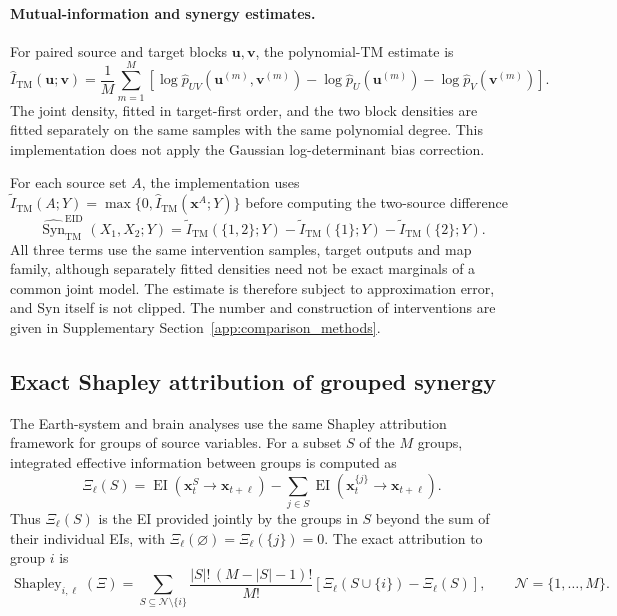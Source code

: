 {\paragraph{Mutual-information and synergy estimates.}
For paired source and target blocks \(\boldsymbol{u},\boldsymbol{v}\), the polynomial-TM estimate is
\begin{equation}
\widehat I_{\mathrm{TM}}(\boldsymbol{u};\boldsymbol{v})
=\frac1M\sum_{m=1}^{M}
\left[
\log\widehat p_{UV}(\boldsymbol{u}^{(m)},\boldsymbol{v}^{(m)})
-\log\widehat p_U(\boldsymbol{u}^{(m)})
-\log\widehat p_V(\boldsymbol{v}^{(m)})
\right].
\label{eq:transport-map-mi-estimator}
\end{equation}
The joint density, fitted in target-first order, and the two block densities are fitted separately on the same samples with the same polynomial degree. This implementation does not apply the Gaussian log-determinant bias correction.

For each source set \(A\), the implementation uses \(\widetilde I_{\mathrm{TM}}(A;Y)=\max\{0,\widehat I_{\mathrm{TM}}(\boldsymbol{x}^{A};Y)\}\) before computing the two-source difference
\begin{equation}
\widehat{\operatorname{Syn}}^{\mathrm{EID}}_{\mathrm{TM}}(X_1,X_2;Y)
=\widetilde I_{\mathrm{TM}}(\{1,2\};Y)
-\widetilde I_{\mathrm{TM}}(\{1\};Y)
-\widetilde I_{\mathrm{TM}}(\{2\};Y).
\label{eq:transport-map-two-source-synergy}
\end{equation}
All three terms use the same intervention samples, target outputs and map family, although separately fitted densities need not be exact marginals of a common joint model. The estimate is therefore subject to approximation error, and Syn itself is not clipped. The number and construction of interventions are given in Supplementary Section~\ref{app:comparison_methods}.
}


\subsection{Exact Shapley attribution of grouped synergy}
\label{app:exact_shapley_attribution}


The Earth-system and brain analyses use the same Shapley attribution framework for groups of source variables. For a subset \(S\) of the \(M\) groups, integrated effective information between groups is computed as
\begin{equation}
\Xi_{\ell}(S)
=
\operatorname{EI}(\boldsymbol{x}_{t}^{S}\to\boldsymbol{x}_{t+\ell})
-
\sum_{j\in S}
\operatorname{EI}(\boldsymbol{x}_{t}^{\{j\}}\to\boldsymbol{x}_{t+\ell}).
\label{eq:shapley_value_function}
\end{equation}
Thus \(\Xi_{\ell}(S)\) is the EI provided jointly by the groups in \(S\) beyond the sum of their individual EIs, with \(\Xi_{\ell}(\varnothing)=\Xi_{\ell}(\{j\})=0\). The exact attribution to group \(i\) is
\begin{equation}
\operatorname{Shapley}_{i,\ell}(\Xi)
=
\sum_{S\subseteq\mathcal{N}\setminus\{i\}}
\frac{|S|!\,(M-|S|-1)!}{M!}
\left[
\Xi_{\ell}(S\cup\{i\})-\Xi_{\ell}(S)
\right],
\qquad \mathcal{N}=\{1,\ldots,M\}.
\label{eq:shapley_exact}
\end{equation}

